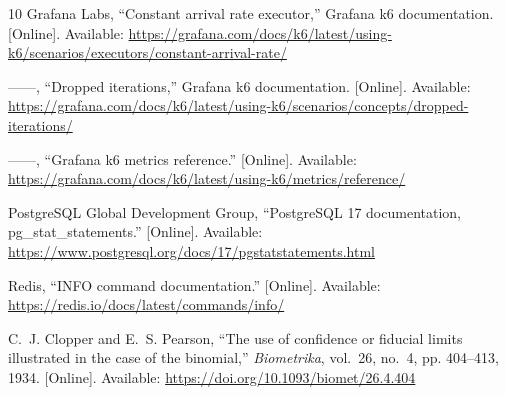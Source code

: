 \documentclass[conference]{IEEEtran}
\begin{document}
\begin{thebibliography}{10}
{Grafana Labs}, ``Constant arrival rate executor,'' Grafana {k6} documentation.
  [Online]. Available:
  \url{https://grafana.com/docs/k6/latest/using-k6/scenarios/executors/constant-arrival-rate/}

------, ``Dropped iterations,'' Grafana {k6} documentation. [Online].
  Available:
  \url{https://grafana.com/docs/k6/latest/using-k6/scenarios/concepts/dropped-iterations/}

------, ``Grafana {k6} metrics reference.'' [Online]. Available:
  \url{https://grafana.com/docs/k6/latest/using-k6/metrics/reference/}

{PostgreSQL Global Development Group}, ``{PostgreSQL} 17 documentation,
  {pg\_stat\_statements}.'' [Online]. Available:
  \url{https://www.postgresql.org/docs/17/pgstatstatements.html}

{Redis}, ``{INFO} command documentation.'' [Online]. Available:
  \url{https://redis.io/docs/latest/commands/info/}

C.~J. Clopper and E.~S. Pearson, ``The use of confidence or fiducial limits
  illustrated in the case of the binomial,'' \emph{Biometrika}, vol.~26,
  no.~4, pp. 404--413, 1934. [Online]. Available:
  \url{https://doi.org/10.1093/biomet/26.4.404}
\end{thebibliography}
\end{document}
